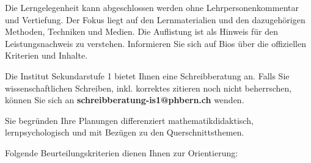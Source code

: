 \documentclass[
  10pt,
  a4paper,
  DIV=11,
  oneside]{scrartcl}
\begin{document}
\begin{tcolorbox}[enhanced jigsaw, opacitybacktitle=0.6, titlerule=0mm, left=2mm, colbacktitle=quarto-callout-warning-color!10!white, breakable, opacityback=0, bottomtitle=1mm, arc=.35mm, colframe=quarto-callout-warning-color-frame, title=\textcolor{quarto-callout-warning-color}{\faExclamationTriangle}\hspace{0.5em}{Warnung}, toptitle=1mm, rightrule=.15mm, colback=white, bottomrule=.15mm, toprule=.15mm, leftrule=.75mm, coltitle=black]

Die Lerngelegenheit kann abgeschlossen werden ohne Lehrpersonenkommentar
und Vertiefung. Der Fokus liegt auf den Lernmaterialien und den
dazugehörigen Methoden, Techniken und Medien. Die Auflistung ist als
Hinweis für den Leistungsnachweis zu verstehen. Informieren Sie sich auf
Bios über die offiziellen Kriterien und Inhalte.

\end{tcolorbox}

\begin{tcolorbox}[enhanced jigsaw, opacitybacktitle=0.6, titlerule=0mm, left=2mm, colbacktitle=quarto-callout-tip-color!10!white, breakable, opacityback=0, bottomtitle=1mm, arc=.35mm, colframe=quarto-callout-tip-color-frame, title=\textcolor{quarto-callout-tip-color}{\faLightbulb}\hspace{0.5em}{Schreibberatung}, toptitle=1mm, rightrule=.15mm, colback=white, bottomrule=.15mm, toprule=.15mm, leftrule=.75mm, coltitle=black]

Die Institut Sekundarstufe 1 bietet Ihnen eine Schreibberatung an. Falls
Sie wissenschaftlichen Schreiben, inkl. korrektes zitieren noch nicht
beherrschen, können Sie sich an \textbf{schreibberatung-is1@phbern.ch}
wenden.

\end{tcolorbox}

Sie begründen Ihre Planungen differenziert mathematikdidaktisch,
lernpsychologisch und mit Bezügen zu den Querschnittsthemen.

Folgende Beurteilungskriterien dienen Ihnen zur Orientierung:
\end{document}
